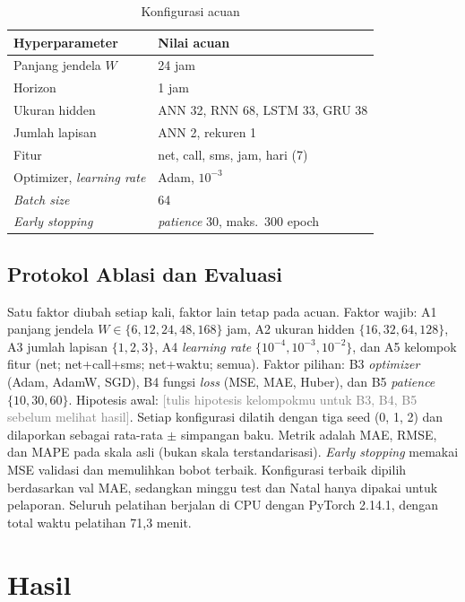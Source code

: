 \documentclass[conference,a4paper]{IEEEtran}
\newcommand{\petunjuk}[1]{\textcolor{gray}{[#1]}}
\begin{document}
\begin{table}[t]
  \centering
  \caption{Konfigurasi acuan}
  \label{tab:acuan}
  \begin{tabular}{@{}ll@{}}
    \toprule
    Hyperparameter & Nilai acuan \\
    \midrule
    Panjang jendela $W$ & 24 jam \\
    Horizon & 1 jam \\
    Ukuran hidden & ANN 32, RNN 68, LSTM 33, GRU 38 \\
    Jumlah lapisan & ANN 2, rekuren 1 \\
    Fitur & net, call, sms, jam, hari (7) \\
    Optimizer, \textit{learning rate} & Adam, $10^{-3}$ \\
    \textit{Batch size} & 64 \\
    \textit{Early stopping} & \textit{patience} 30, maks.\ 300 epoch \\
    \bottomrule
  \end{tabular}
\end{table}

\subsection{Protokol Ablasi dan Evaluasi}
Satu faktor diubah setiap kali, faktor lain tetap pada acuan. Faktor wajib: A1 panjang jendela $W \in \{6, 12, 24, 48, 168\}$ jam, A2 ukuran hidden $\{16, 32, 64, 128\}$, A3 jumlah lapisan $\{1, 2, 3\}$, A4 \textit{learning rate} $\{10^{-4}, 10^{-3}, 10^{-2}\}$, dan A5 kelompok fitur (net; net+call+sms; net+waktu; semua). Faktor pilihan: B3 \textit{optimizer} (Adam, AdamW, SGD), B4 fungsi \textit{loss} (MSE, MAE, Huber), dan B5 \textit{patience} $\{10, 30, 60\}$. Hipotesis awal: \petunjuk{tulis hipotesis kelompokmu untuk B3, B4, B5 sebelum melihat hasil}. Setiap konfigurasi dilatih dengan tiga seed (0, 1, 2) dan dilaporkan sebagai rata-rata $\pm$ simpangan baku. Metrik adalah MAE, RMSE, dan MAPE pada skala asli (bukan skala terstandarisasi). \textit{Early stopping} memakai MSE validasi dan memulihkan bobot terbaik. Konfigurasi terbaik dipilih berdasarkan val MAE, sedangkan minggu test dan Natal hanya dipakai untuk pelaporan. Seluruh pelatihan berjalan di CPU dengan PyTorch 2.14.1, dengan total waktu pelatihan 71,3 menit.

\section{Hasil}
\end{document}
